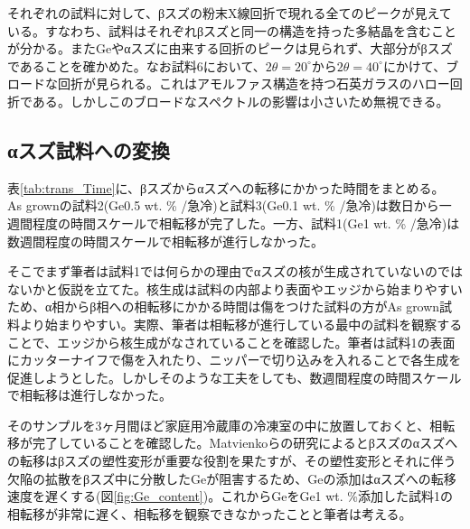 それぞれの試料に対して、βスズの粉末X線回折で現れる全てのピークが見えている。すなわち、試料はそれぞれβスズと同一の構造を持った多結晶を含むことが分かる。またGeやαスズに由来する回折のピークは見られず、大部分がβスズであることを確かめた。なお試料6において、$2\theta=20^\circ$から$2\theta=40^\circ$にかけて、ブロードな回折が見られる。これはアモルファス構造を持つ石英ガラスのハロー回折である\cite{Speakman}。しかしこのブロードなスペクトルの影響は小さいため無視できる。

\subsection{αスズ試料への変換}
表\ref{tab:trans_Time}に、βスズからαスズへの転移にかかった時間をまとめる。
As grownの試料2(Ge0.5 wt. \% /急冷)と試料3(Ge0.1 wt. \% /急冷)は数日から一週間程度の時間スケールで相転移が完了した。一方、試料1(Ge1 wt. \% /急冷)は数週間程度の時間スケールで相転移が進行しなかった。

そこでまず筆者は試料1では何らかの理由でαスズの核が生成されていないのではないかと仮説を立てた。核生成は試料の内部より表面やエッジから始まりやすい\cite{Cornelius}ため、α相からβ相への相転移にかかる時間は傷をつけた試料の方がAs grown試料より始まりやすい。実際、筆者は相転移が進行している最中の試料を観察することで、エッジから核生成がなされていることを確認した。筆者は試料1の表面にカッターナイフで傷を入れたり、ニッパーで切り込みを入れることで各生成を促進しようとした。しかしそのような工夫をしても、数週間程度の時間スケールで相転移は進行しなかった。

そのサンプルを3ヶ月間ほど家庭用冷蔵庫の冷凍室の中に放置しておくと、相転移が完了していることを確認した。Matvienkoらの研究によるとβスズのαスズへの転移はβスズの塑性変形が重要な役割を果たすが、その塑性変形とそれに伴う欠陥の拡散をβスズ中に分散したGeが阻害するため、Geの添加はαスズへの転移速度を遅くする\cite{Matvienko}(図\ref{fig:Ge_content})。これからGeをGe1 wt. \%添加した試料1の相転移が非常に遅く、相転移を観察できなかったことと筆者は考える。

